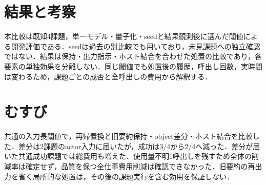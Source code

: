 \documentclass[letter]{ieicej}
\begin{document}
\section{結果と考察}


本比較は既知4課題，単一モデル・量子化・seedと結果観測後に選んだ閾値による開発評価である．seedは過去の別比較でも用いており，未見課題への独立確認ではない．結果は保持・出力指示・ホスト結合を合わせた処置の比較であり，各要素の単独効果を分離しない．同じ閾値でも処置後の履歴，呼出し回数，実時間は変わるため，課題ごとの成否と全呼出しの費用から解釈する．

\section{むすび}
共通の入力長閾値で，再帰置換と旧要約保持・object差分・ホスト結合を比較した．差分は2課題のactor入力に届いたが，成功は3/4から2/4へ減った．差分が届いた共通成功課題では総費用も増えた．使用量不明1呼出しを残すため全体の削減率は確定せず，品質を保つ全仕事費用削減は確認できなかった．旧要約の再出力を省く局所的な処置は，その後の課題実行を含む効用を保証しない．


\end{document}
